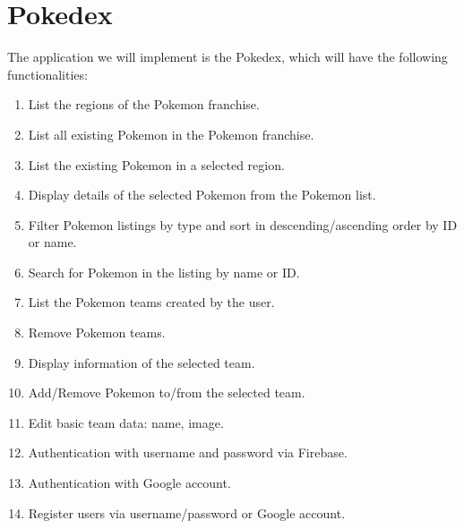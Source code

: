 \documentclass[a4paper, 12pt]{article}
\begin{document}
\section{Pokedex}

The application we will implement is the Pokedex, which will have the following functionalities:

\begin{enumerate}
    \item List the regions of the Pokemon franchise.

    \item List all existing Pokemon in the Pokemon franchise.
    
    \item List the existing Pokemon in a selected region.
    
    \item Display details of the selected Pokemon from the Pokemon list.
    
    \item Filter Pokemon listings by type and sort in descending/ascending order by ID or name.
    
    \item Search for Pokemon in the listing by name or ID.
    
    \item List the Pokemon teams created by the user.
    
    \item Remove Pokemon teams.
    
    \item Display information of the selected team.
    
    \item Add/Remove Pokemon to/from the selected team.
    
    \item Edit basic team data: name, image.
    
    \item Authentication with username and password via Firebase.
    
    \item Authentication with Google account.
    
    \item Register users via username/password or Google account.
\end{enumerate}
\end{document}

